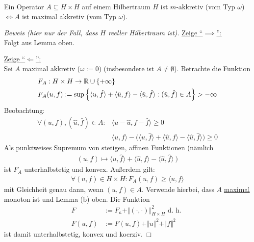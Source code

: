 \begin{theorem}[Minty]\enter
Ein Operator $A\subseteq H\times H$ auf einem Hilbertraum $H$ ist $m$-akkretiv (vom Typ $\omega$) $\Longleftrightarrow A$ ist maximal akkretiv (vom Typ $\omega$).
\end{theorem}
\begin{proof}[Beweis (hier nur der Fall, dass $H$ reeller Hilbertraum ist)]\enter
\underline{Zeige ``$\implies$'':}\\
Folgt aus Lemma oben.\

\underline{Zeige ``$\Longleftarrow$'':}\\
Sei $A$ maximal akkretiv ($\omega:=0$) (insbesondere ist $A\neq\emptyset$). Betrachte die Funktion 
\begin{align*}
&F_A:H\times H\to\mathbb{R}\cup\lbrace+\infty\rbrace\\
&F_A(u,f):=\sup\Big\lbrace\langle u,\hat{f}\rangle+\langle\hat{u},f\rangle-\langle\hat{u},\hat{f}\rangle:(\hat{u},\hat{f})\in A\Big\rbrace>-\infty
\end{align*}
Beobachtung: 
\begin{align*}
\forall (u,f),(\hat{u},\hat{f})\in A:
&\big\langle u-\hat{u},f-\hat{f}\big\rangle\geq0\\
&\langle u,f\rangle-\Big(\big\langle u,\hat{f}\big\rangle+\big\langle\hat{u},f\big\rangle-\big\langle\hat{u},\hat{f}\big\rangle\Big)\geq0
\end{align*}
Als punktweises Supremum von stetigen, affinen Funktionen (nämlich 
\begin{align*}
(u,f)\mapsto\big\langle u,\hat{f}\big\rangle+\big\langle\hat{u},f\big\rangle-\big\langle\hat{u},\hat{f}\big\rangle~\big)
\end{align*}
ist $F_A$ unterhalbstetig und konvex. Außerdem gilt:
\begin{align*}
\forall (u,f)\in H\times H:F_A(u,f)\geq\langle u,f\rangle
\end{align*}
mit Gleichheit genau dann, wenn $(u,f)\in A$. Verwende hierbei, dass $A$ \ul{maximal} monoton ist und Lemma (b) oben. Die Funktion
\begin{align*}
F&:=F_a+\Vert(\cdot,\cdot)\Vert^2_{H\times H}\text{ d. h. }\\
F(u,f)&:=F(u,f)+\Vert u\Vert^2+\Vert f\Vert^2
\end{align*}
ist damit unterhalbstetig, konvex und koerziv.
\end{proof}